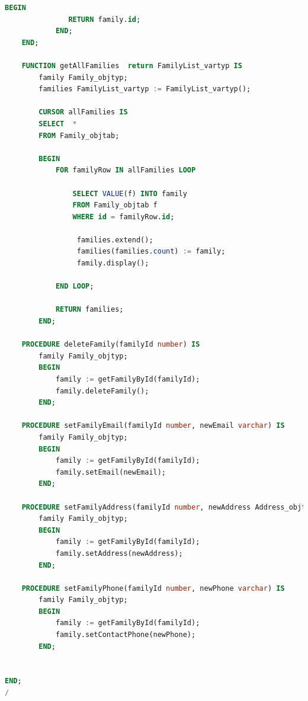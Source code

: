 \documentclass{FR16}
\begin{document}
\begin{lstlisting}[language=Sql, basicstyle=\scriptsize]
            BEGIN
               RETURN family.id;
            END; 
    END;  

    FUNCTION getAllFamilies  return FamilyList_vartyp IS
        family Family_objtyp;
        families FamilyList_vartyp := FamilyList_vartyp();

        CURSOR allFamilies IS
		SELECT  *
		FROM Family_objtab;

        BEGIN 
		    FOR familyRow IN allFamilies LOOP
                
                SELECT VALUE(f) INTO family
                FROM Family_objtab f
                WHERE id = familyRow.id;

                 families.extend();
                 families(families.count) := family;
                 family.display();

            END LOOP;

            RETURN families;
        END;

    PROCEDURE deleteFamily(familyId number) IS
        family Family_objtyp;
        BEGIN
            family := getFamilyById(familyId);
            family.deleteFamily();
        END; 

    PROCEDURE setFamilyEmail(familyId number, newEmail varchar) IS
        family Family_objtyp;
        BEGIN
            family := getFamilyById(familyId);
            family.setEmail(newEmail);
        END; 

    PROCEDURE setFamilyAddress(familyId number, newAddress Address_objtyp) IS
        family Family_objtyp;
        BEGIN
            family := getFamilyById(familyId);
            family.setAddress(newAddress);
        END; 

    PROCEDURE setFamilyPhone(familyId number, newPhone varchar) IS
        family Family_objtyp;
        BEGIN
            family := getFamilyById(familyId);
            family.setContactPhone(newPhone);
        END; 
 

END;
/
\end{lstlisting}
\newpage
\end{document}
